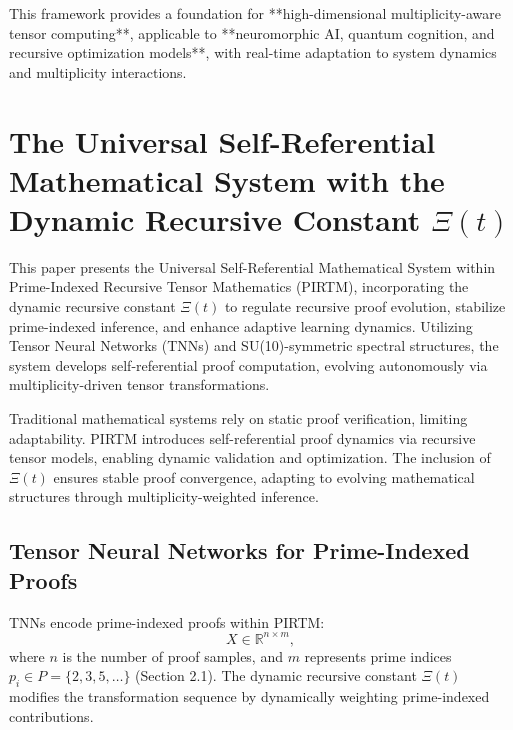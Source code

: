 \documentclass{article}
\theoremstyle{plain}
\begin{document}
This framework provides a foundation for **high-dimensional multiplicity-aware tensor computing**, applicable to **neuromorphic AI, quantum cognition, and recursive optimization models**, with real-time adaptation to system dynamics and multiplicity interactions.


\section{The Universal Self-Referential Mathematical System with the Dynamic Recursive Constant \(\Xi(t) \)}

This paper presents the Universal Self-Referential Mathematical System within Prime-Indexed Recursive Tensor Mathematics (PIRTM), incorporating the dynamic recursive constant \(\Xi(t) \) to regulate recursive proof evolution, stabilize prime-indexed inference, and enhance adaptive learning dynamics. Utilizing Tensor Neural Networks (TNNs) and SU(10)-symmetric spectral structures, the system develops self-referential proof computation, evolving autonomously via multiplicity-driven tensor transformations.

Traditional mathematical systems rely on static proof verification, limiting adaptability. PIRTM introduces self-referential proof dynamics via recursive tensor models, enabling dynamic validation and optimization. The inclusion of \(\Xi(t) \) ensures stable proof convergence, adapting to evolving mathematical structures through multiplicity-weighted inference.

\subsection{Tensor Neural Networks for Prime-Indexed Proofs}
TNNs encode prime-indexed proofs within PIRTM:
\begin{equation}
X \in \mathbb{R}^{n \times m},
\end{equation}
where \( n \) is the number of proof samples, and \( m \) represents prime indices \( p_i \in P = \{2, 3, 5, \dots\} \) (Section 2.1). The dynamic recursive constant \(\Xi(t) \) modifies the transformation sequence by dynamically weighting prime-indexed contributions.
\end{document}
